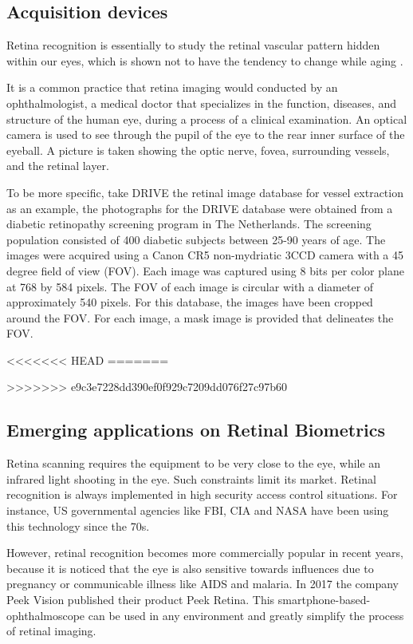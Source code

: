 \documentclass[a4paper,11pt]{article}
\theoremstyle{plain} %
\begin{document}
\subsection{Acquisition devices}
Retina recognition is essentially to study the retinal vascular pattern hidden within our eyes, which is shown not to have the tendency to change while aging \cite{fatima2013feature}. 

It is a common practice that retina imaging would conducted by an ophthalmologist, a medical doctor that specializes in the function, diseases, and structure of the human eye, during a process of a clinical examination. An optical camera is used to see through the pupil of the eye to the rear inner surface of the eyeball. A picture is taken showing the optic nerve, fovea, surrounding vessels, and the retinal layer.

To be more specific, take DRIVE the retinal image database for vessel extraction as an example, the photographs for the DRIVE database were obtained from a diabetic retinopathy screening program in The Netherlands. The screening population consisted of 400 diabetic subjects between 25-90 years of age. The images were acquired using a Canon CR5 non-mydriatic 3CCD camera with a 45 degree field of view (FOV). Each image was captured using 8 bits per color plane at 768 by 584 pixels. The FOV of each image is circular with a diameter of approximately 540 pixels. For this database, the images have been cropped around the FOV. For each image, a mask image is provided that delineates the FOV.

<<<<<<< HEAD
=======

>>>>>>> e9c3e7228dd390ef0f929c7209dd076f27c97b60
\subsection{Emerging applications on Retinal Biometrics}
Retina scanning requires the equipment to be very close to the eye, while an infrared light shooting in the eye. Such constraints limit its market. Retinal recognition is always implemented in high security access control situations. For instance, US governmental agencies like FBI, CIA and NASA have been using this technology since the 70s.

However, retinal recognition becomes more commercially popular in recent years, because it is noticed that the  eye is also sensitive towards  influences due to pregnancy or communicable illness like AIDS and malaria. In 2017 the company Peek Vision published their product Peek Retina. This smartphone-based-ophthalmoscope can be used in any environment and greatly simplify the process of retinal imaging. 
\end{document}

